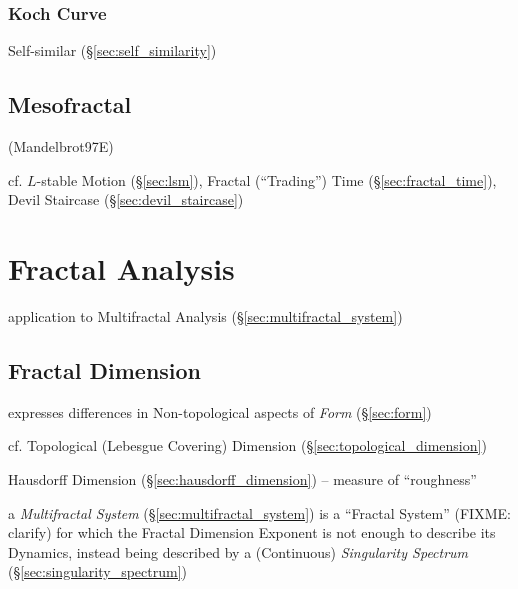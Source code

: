 \subsubsection{Koch Curve}\label{sec:koch_curve}

Self-similar (\S\ref{sec:self_similarity})



\subsection{Mesofractal}\label{sec:mesofractal}

(Mandelbrot97E)

cf. $L$-stable Motion (\S\ref{sec:lsm}), Fractal (``Trading'') Time
(\S\ref{sec:fractal_time}), Devil Staircase (\S\ref{sec:devil_staircase})



\section{Fractal Analysis}\label{sec:fractal_analysis}

application to Multifractal Analysis (\S\ref{sec:multifractal_system})



\subsection{Fractal Dimension}\label{sec:fractal_dimension}

expresses differences in Non-topological aspects of \emph{Form}
(\S\ref{sec:form})

cf. Topological (Lebesgue Covering) Dimension
(\S\ref{sec:topological_dimension})

Hausdorff Dimension (\S\ref{sec:hausdorff_dimension}) -- measure of
``roughness''

\fist a \emph{Multifractal System} (\S\ref{sec:multifractal_system}) is a
``Fractal System'' (FIXME: clarify) for which the Fractal Dimension Exponent is
not enough to describe its Dynamics, instead being described by a (Continuous)
\emph{Singularity Spectrum} (\S\ref{sec:singularity_spectrum})

